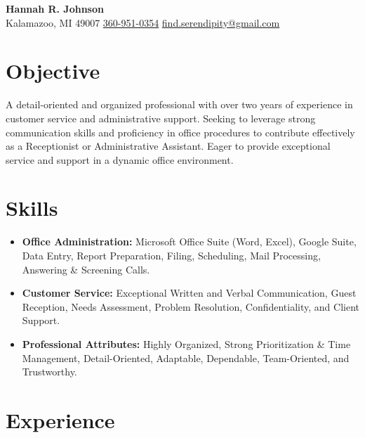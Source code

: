 \documentclass[a4paper,10pt]{article}
\begin{document}
\begin{center}
    {\LARGE \textbf{Hannah R. Johnson}} \\
    \vspace{1mm}
    Kalamazoo, MI 49007 \textbar{} \href{tel:360-951-0354}{360-951-0354} \textbar{} \href{mailto:find.serendipity@gmail.com}{find.serendipity@gmail.com}
\end{center}

\section{Objective}
A detail-oriented and organized professional with over two years of experience in customer service and administrative support. Seeking to leverage strong communication skills and proficiency in office procedures to contribute effectively as a Receptionist or Administrative Assistant. Eager to provide exceptional service and support in a dynamic office environment.

\section{Skills}

\begin{itemize}[leftmargin=*, nosep]
    \item \textbf{Office Administration:} Microsoft Office Suite (Word, Excel), Google Suite, Data Entry, Report Preparation, Filing, Scheduling, Mail Processing, Answering \& Screening Calls.
    \item \textbf{Customer Service:} Exceptional Written and Verbal Communication, Guest Reception, Needs Assessment, Problem Resolution, Confidentiality, and Client Support.
    \item \textbf{Professional Attributes:} Highly Organized, Strong Prioritization \& Time Management, Detail-Oriented, Adaptable, Dependable, Team-Oriented, and Trustworthy.
\end{itemize}

\section{Experience}
\end{document}
